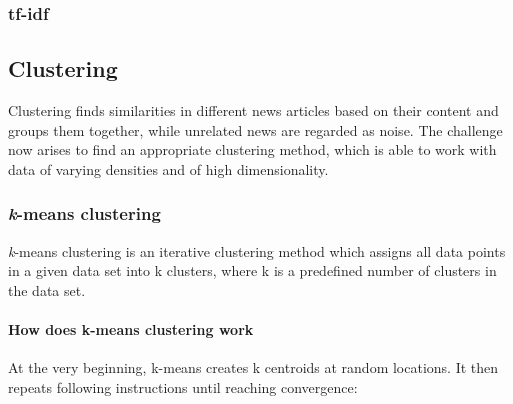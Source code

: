 \subsubsection{tf-idf}

\begin{table}[h]
    \centering
    \caption{tf-idf \Gls{vsm}.}
    \label{tab:tfidf_vsm}
\end{table}


\subsection{Clustering}
Clustering finds similarities in different news articles based on their content and groups them together,
while unrelated news are regarded as noise.
The challenge now arises to find an appropriate clustering method,
which is able to work with data of varying densities and of high dimensionality.


\subsubsection{\textit{k}-means clustering}
\textit{k}-means clustering is an iterative clustering method which assigns all data points in a given data set
into k clusters, where k is a predefined number of clusters in the data set.

\paragraph{How does k-means clustering work}
At the very beginning, k-means creates k centroids at random locations.
It then repeats following instructions until reaching convergence:

